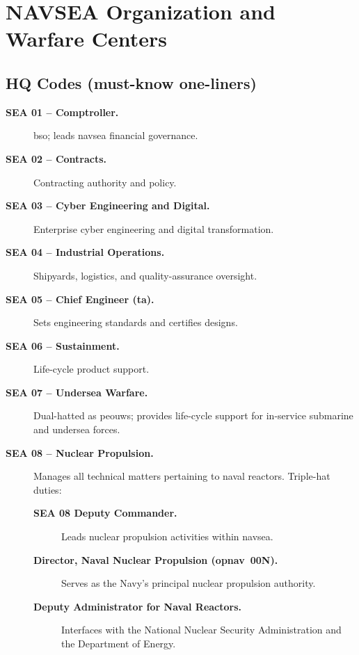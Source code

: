 \documentclass[../main.tex]{subfiles}
\begin{document}

\section{NAVSEA Organization and Warfare Centers}
\minibib
\subsection{HQ Codes (must-know one-liners)}

\begin{description}
	\item[\textbf{SEA 01 -- Comptroller.}] \ac{bso}; leads \ac{navsea} financial governance.
	\item[\textbf{SEA 02 -- Contracts.}] Contracting authority and policy.
	\item[\textbf{SEA 03 -- Cyber Engineering and Digital.}] Enterprise cyber engineering and digital transformation.
	\item[\textbf{SEA 04 -- Industrial Operations.}] Shipyards, logistics, and quality-assurance oversight.
	\item[\textbf{SEA 05 -- Chief Engineer (\ac{ta}).}] Sets engineering standards and certifies designs.
	\item[\textbf{SEA 06 -- Sustainment.}] Life-cycle product support.
	\item[\textbf{SEA 07 -- Undersea Warfare.}] Dual-hatted as \ac{peouws}; provides life-cycle support for in-service submarine and undersea forces.
	\item[\textbf{SEA 08 -- Nuclear Propulsion.}] Manages all technical matters pertaining to naval reactors. Triple-hat duties:
      \begin{description}
        \item[\textbf{SEA 08 Deputy Commander.}] Leads nuclear propulsion activities within \ac{navsea}.
        \item[\textbf{Director, Naval Nuclear Propulsion (\ac{opnav}~00N).}] Serves as the Navy's principal nuclear propulsion authority.
        \item[\textbf{Deputy Administrator for Naval Reactors.}] Interfaces with the National Nuclear Security Administration and the Department of Energy.
      \end{description}

\end{description}
\end{document}
